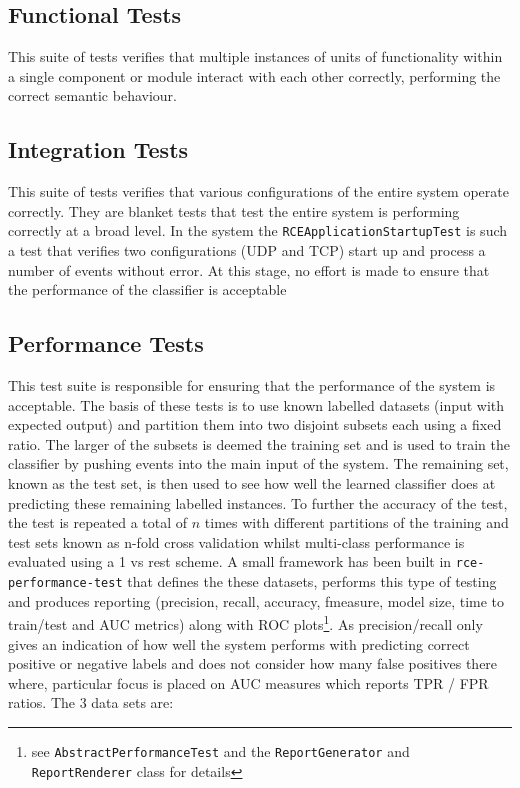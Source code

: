 \documentclass[a4paper,11pt]{scrreprt}
\begin{document}
\subsection{Functional Tests}
This suite of tests verifies that multiple instances of units of functionality within a single component or module interact with each other correctly, performing the correct semantic behaviour.
\subsection{Integration Tests}
This suite of tests verifies that various configurations of the entire system operate correctly. They are blanket tests that test the entire system is performing correctly at a broad level. In the system the \verb|RCEApplicationStartupTest| is such a test that verifies two configurations (UDP and TCP) start up and process a number of events without error. At this stage, no effort is made to ensure that the performance of the classifier is acceptable
\subsection{Performance Tests}
This test suite is responsible for ensuring that the performance of the system is acceptable. The basis of these tests is to use known labelled datasets (input with expected output) and partition them into two disjoint subsets each using a fixed ratio. The larger of the subsets is deemed the training set and is used to train the classifier by pushing events into the main input of the system. The remaining set, known as the test set, is then used to see how well the learned classifier does at predicting these remaining labelled instances. To further the accuracy of the test, the test is repeated a total of \(n\) times with different partitions of the training and test sets known as n-fold cross validation whilst multi-class performance is evaluated using a 1 vs rest scheme\cite{flach}. A small framework has been built in \verb|rce-performance-test| that defines the these datasets, performs this type of testing and produces reporting (precision, recall, accuracy, fmeasure, model size, time to train/test and AUC metrics) along with ROC\cite{roc-analysis} plots\footnote{see \verb|AbstractPerformanceTest| and the \verb|ReportGenerator| and \verb|ReportRenderer| class for details}. As precision/recall only gives an indication of how well the system performs with predicting correct positive or negative labels and does not consider how many false positives there where, particular focus is placed on AUC measures which reports TPR / FPR ratios. The 3 data sets are:
\end{document}
